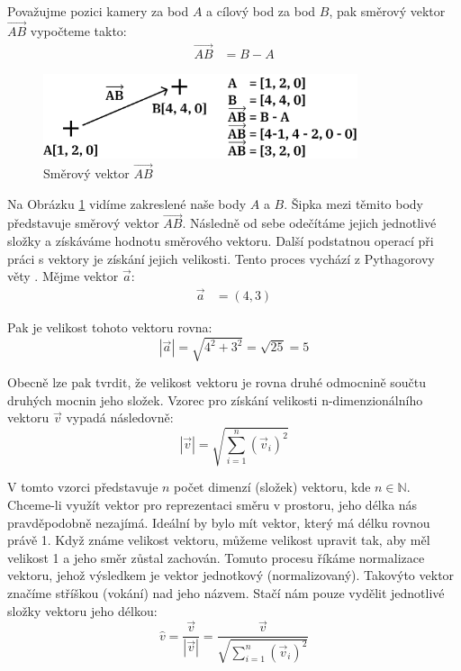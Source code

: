 \documentclass[12pt]{article}
\begin{document}
Považujme pozici kamery za bod $A$ a cílový bod za bod $B$, pak směrový vektor $\vec{AB}$ vypočteme takto:
\begin{align}
    \vec{AB} &= B - A
\end{align}

\vspace{0.5cm}
\begin{figure}[h]
    \centering
    \includegraphics[height=2.5cm]{images/vector_sub.png}
    \caption{Směrový vektor $\vec{AB}$}
    \label{fig:Směrový vektor AB}
\end{figure}

Na Obrázku \ref{fig:Směrový vektor AB} vidíme zakreslené naše body $A$ a $B$. Šipka mezi těmito body představuje směrový vektor $\vec{AB}$. Následně od sebe odečítáme jejich jednotlivé složky a získáváme hodnotu směrového vektoru. Další podstatnou operací při práci s vektory je získání jejich velikosti. Tento proces vychází z Pythagorovy věty \cite{pythagorean_theorem}. Mějme vektor $\vec{a}$:
\begin{align}
    \vec{a} &= (4, 3)
\end{align}

Pak je velikost tohoto vektoru rovna:
\begin{equation}
    |\vec{a}| = \sqrt{4^2 + 3^2} = \sqrt{25} = 5
\end{equation}

Obecně lze pak tvrdit, že velikost vektoru je rovna druhé odmocnině součtu druhých mocnin jeho složek. Vzorec pro získání velikosti n-dimenzionálního vektoru $\vec{v}$ vypadá následovně:
\begin{equation}
    |\vec{v}| = \sqrt{\sum_{i = 1}^{n} (\vec{v}_i)^2}
\end{equation}

V tomto vzorci představuje $n$ počet dimenzí (složek) vektoru, kde $n \in \mathbb{N}$. Chceme-li využít vektor pro reprezentaci směru v prostoru, jeho délka nás pravděpodobně nezajímá. Ideální by bylo mít vektor, který má délku rovnou právě 1. Když známe velikost vektoru, můžeme velikost upravit tak, aby měl velikost 1 a jeho směr zůstal zachován. Tomuto procesu říkáme normalizace vektoru, jehož výsledkem je vektor jednotkový (normalizovaný). Takovýto vektor značíme stříškou (vokání) nad jeho názvem. Stačí nám pouze vydělit jednotlivé složky vektoru jeho délkou:
\begin{equation}
    \hat{v} = \frac{\vec{v}}{|\vec{v}|} = \frac{\vec{v}}{\sqrt{\sum_{i = 1}^{n} (\vec{v}_i)^2}}
\end{equation}
\end{document}
